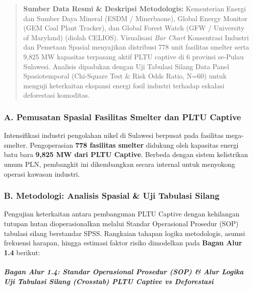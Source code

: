 \documentclass[
]{article}
\begin{document}
\begin{quote}
\textbf{Sumber Data Resmi \& Deskripsi Metodologis:} Kementerian Energi
dan Sumber Daya Mineral (ESDM / Minerbaone), Global Energy Monitor (GEM
Coal Plant Tracker), dan Global Forest Watch (GFW / University of
Maryland) (diolah CELIOS). Visualisasi \emph{Bar Chart} Konsentrasi
Industri dan Pemetaan Spasial menyajikan distribusi 778 unit fasilitas
smelter serta 9,825 MW kapasitas terpasang aktif PLTU captive di 6
provinsi se-Pulau Sulawesi. Analisis dipadukan dengan Uji Tabulasi
Silang Data Panel Spasiotemporal (Chi-Square Test \& Risk Odds Ratio,
N=60) untuk menguji keterkaitan ekspansi energi fosil industri terhadap
eskalasi deforestasi komoditas.
\end{quote}

\subsubsection{A. Pemusatan Spasial Fasilitas Smelter dan PLTU
Captive}\label{a.-pemusatan-spasial-fasilitas-smelter-dan-pltu-captive}

Intensifikasi industri pengolahan nikel di Sulawesi berpusat pada
fasilitas mega-smelter. Pengoperasian \textbf{778 fasilitas smelter}
didukung oleh kapasitas energi batu bara \textbf{9,825 MW dari PLTU
Captive}. Berbeda dengan sistem kelistrikan umum PLN, pembangkit ini
dikembangkan secara internal untuk menyokong operasi kawasan industri.

\subsubsection{B. Metodologi: Analisis Spasial \& Uji Tabulasi
Silang}\label{b.-metodologi-analisis-spasial-uji-tabulasi-silang}

Pengujian keterkaitan antara pembangunan PLTU Captive dengan kehilangan
tutupan hutan dioperasionalkan melalui Standar Operasional Prosedur
(SOP) tabulasi silang berstandar SPSS. Rangkaian tahapan logika
metodologis, asumsi frekuensi harapan, hingga estimasi faktor risiko
dimodelkan pada \textbf{Bagan Alur 1.4} berikut:

\subparagraph{Bagan Alur 1.4: Standar Operasional Prosedur (SOP) \& Alur
Logika Uji Tabulasi Silang (Crosstab) PLTU Captive vs
Deforestasi}\label{bagan-alur-1.4-standar-operasional-prosedur-sop-alur-logika-uji-tabulasi-silang-crosstab-pltu-captive-vs-deforestasi}
\end{document}
